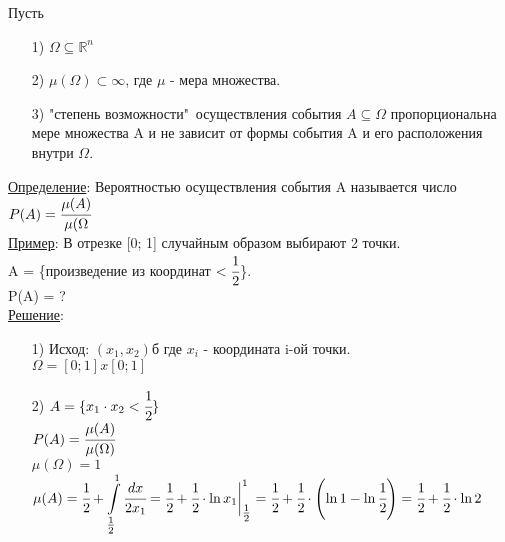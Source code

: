 
Пусть 
\begin{enumerate}
\item[1)] $\Omega \subseteq \mathbb{R}^n$ \\

\item[2)] $\mu (\Omega) \subset \infty$, где $\mu$ - мера множества. 

\item[3)] "степень возможности"\ осуществления события $A \subseteq \Omega$ пропорциональна мере множества A и не зависит от формы события A и его расположения внутри $\Omega$. \\
\end{enumerate}


\underline{Определение}: Вероятностью осуществления события A называется число \\
$P(A) = \cfrac{\mu (A)}{\mu (\Omega}$ \\


\underline{Пример}: В отрезке [0; 1] случайным образом выбирают 2 точки. \\
A = \{произведение из координат $< \cfrac{1}{2}$\}. \\
P(A) = ? \\
\underline{Решение}:
\begin{enumerate}
\item[1)]
Исход: $(x_1, x_2)$б где $x_i$ - координата i-ой точки. \\
$\Omega = [0;1] x [0;1]$ \\

\item[2)] $A = \{x_1 \cdot x_2 < \cfrac{1}{2} \}$ \\
$P(A) = \cfrac{\mu (A)}{\mu (\Omega)}$ \\
$\mu (\Omega) = 1$ \\
$\displaystyle \mu (A) = \cfrac{1}{2} + \int\limits_{\tfrac{1}{2}}^{1} \cfrac{dx}{2x_1} = \cfrac{1}{2} + \cfrac{1}{2} \cdot \ln{x_1} \bigg|_{\tfrac{1}{2}}^{1} = \cfrac{1}{2} + \cfrac{1}{2} \cdot \left( \ln{1} - \ln{\cfrac{1}{2}} \right) = \cfrac{1}{2} + \cfrac{1}{2} \cdot \ln{2}$ \\
\end{enumerate}


































